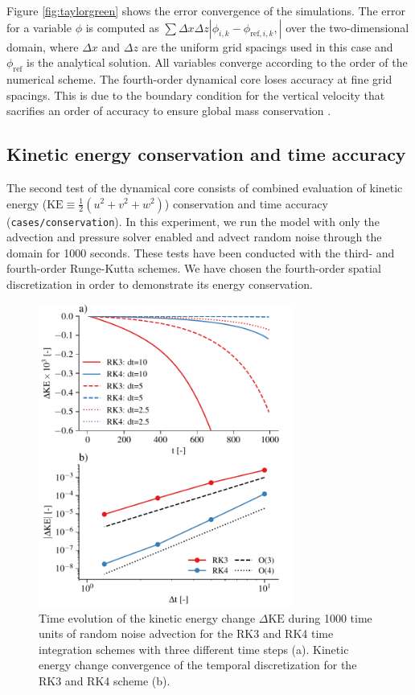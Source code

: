 \documentclass[gmd,manuscript]{copernicus}
\begin{document}
Figure \ref{fig:taylorgreen} shows the error convergence of the simulations. The error for a variable $\phi$ is computed as $\sum \Delta x \Delta z \left| \phi_{i,k} - \phi_{\textrm{ref},i,k}, \right|$ over the two-dimensional domain, where $\Delta x$ and $\Delta z$ are the uniform grid spacings used in this case and $\phi_{\textrm{ref}}$ is the analytical solution. All variables converge according to the order of the numerical scheme. The fourth-order dynamical core loses accuracy at fine grid spacings. This is due to the boundary condition for the vertical velocity that sacrifies an order of accuracy to ensure global mass conservation \citep{Morinishi1998}.

\subsection{Kinetic energy conservation and time accuracy} \label{sec:validationtime}
The second test of the dynamical core consists of combined evaluation of kinetic energy ($\textrm{KE} \equiv \frac{1}{2}\left( u^2 + v^2 + w^2 \right)$) conservation and time accuracy 
(\texttt{cases/conservation}). In this experiment, we run the model with only the advection and pressure solver enabled and advect random noise through the domain for 1000 seconds. These tests have been conducted with the third- and fourth-order Runge-Kutta schemes. We have chosen the fourth-order spatial discretization in order to demonstrate its energy conservation.
\begin{figure}[t]
\vspace*{2mm}
\begin{center}
\includegraphics[width=8.3cm]{figs/timeconvergence.pdf}
\end{center}
\caption{Time evolution of the kinetic energy change $\Delta \textrm{KE}$ during 1000 time units of random noise advection for the RK3 and RK4 time integration schemes with three different time steps (a). Kinetic energy change convergence of the temporal discretization for the RK3 and RK4 scheme (b).}\label{fig:timeconvergence}
\end{figure}
\end{document}
